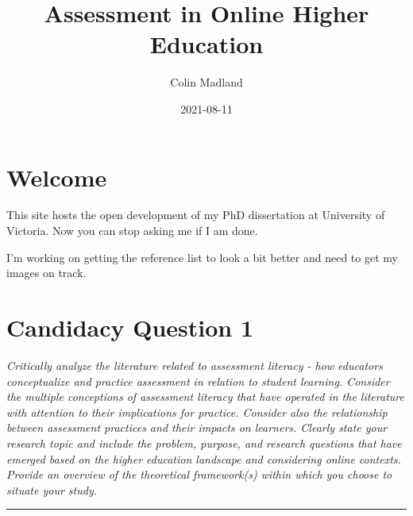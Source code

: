 \documentclass[
]{book}
\title{Assessment in Online Higher Education}
\author{Colin Madland}
\date{2021-08-11}
\begin{document}
\maketitle

{
\setcounter{tocdepth}{1}
\tableofcontents
}
\hypertarget{welcome}{%
\chapter{Welcome}\label{welcome}}

This site hosts the open development of my PhD dissertation at University of Victoria. Now you can stop asking me if I am done.

I'm working on getting the reference list to look a bit better and need to get my images on track.

\hypertarget{candidacy-question-1}{%
\chapter{Candidacy Question 1}\label{candidacy-question-1}}

\emph{Critically analyze the literature related to assessment literacy - how educators conceptualize and practice assessment in relation to student learning. Consider the multiple conceptions of assessment literacy that have operated in the literature with attention to their implications for practice. Consider also the relationship between assessment practices and their impacts on learners. Clearly state your research topic and include the problem, purpose, and research questions that have emerged based on the higher education landscape and considering online contexts. Provide an overview of the theoretical framework(s) within which you choose to situate your study.}

\begin{center}\rule{0.5\linewidth}{0.5pt}\end{center}
\end{document}
